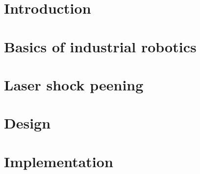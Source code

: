 \documentclass[a4paper,twoside,12pt]{book}
\renewcommand{\chaptermark}[1]{\markboth{#1}{#1}}
\begin{document}



\chapter*{Introduction} %

\pagestyle{fancy}
\renewcommand{\chaptermark}[1]{\markboth{#1}{#1}}
\fancyhead[R]{\chaptername\ \thechapter\ --\ \leftmark}
\fancyhead[L]{}





\mainmatter

\chapter{Basics of industrial robotics}



\chapter{Laser shock peening}

    

\chapter{Design}

    

\chapter{Implementation}
\end{document}
